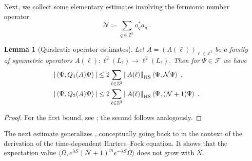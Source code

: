 \documentclass[12pt,a4paper]{article}
\numberwithin{equation}{section}
\newcommand{\cF}{\mathcal{F}}
\newcommand{\cN}{\mathcal{N}}
\newcommand{\1}{\mathbb{I}}
\newcommand{\HS}{\mathrm{HS}}
\newcommand{\Zstar}{\mathbb{Z}^3} %
\newcommand{\Z}{\mathbb{Z}}
\newcommand{\eva}[1]{\left\langle #1 \right\rangle}
\theoremstyle{plain}
\newtheorem{lemma}[theorem]{Lemma}
\theoremstyle{definition}
\theoremstyle{remark}
\theoremstyle{plain}
\theoremstyle{definition}
\theoremstyle{remark}
\begin{document}
Next, we collect some elementary estimates involving the fermionic number operator
\begin{equation} \label{eq:cN}
	\cN \coloneq \sum_{q \in \Z^3} a_q^* a_q \;.
\end{equation}

\begin{lemma}[Quadratic operator estimates]\label{lem:estQ2}
Let $A = (A(\ell))_{\ell \in \Zstar}$ be a family of symmetric operators $ A(\ell) : \ell^2(L_\ell) \to \ell^2(L_\ell) $. Then for $ \Psi \in \cF $ we have
\begin{equation} \label{eq:Qest}
\begin{aligned}
	|\eva{\Psi,Q_1(A)\Psi}|
	&\leq 2\sum_{\ell\in \Zstar}\norm{A(\ell)}_{\HS}\eva{\Psi,\mathcal{N} \Psi} \;, \\
	|\eva{\Psi,Q_2(A)\Psi}|
	&\leq 2\sum_{\ell\in \Zstar}\norm{A(\ell)}_{\HS}\eva{\Psi,(\mathcal{N}+1) \Psi} \;.
\end{aligned}
\end{equation}
\end{lemma}

\begin{proof}
For the first bound, see \cite[Prop.~4.7]{CHN22}; the second follows analogously.
\end{proof}

The next estimate generalizes \cite[Prop.~5.8]{CHN22}, conceptually going back to \cite{BJP+16,BPS14b} in the context of the derivation of the time-dependent Hartree--Fock equation. It shows that the expectation value $ \langle \Omega, e^{\lambda S} (\mathcal{N} + 1)^m e^{-\lambda S} \Omega \rangle$ does not grow with $N$.
\end{document}
